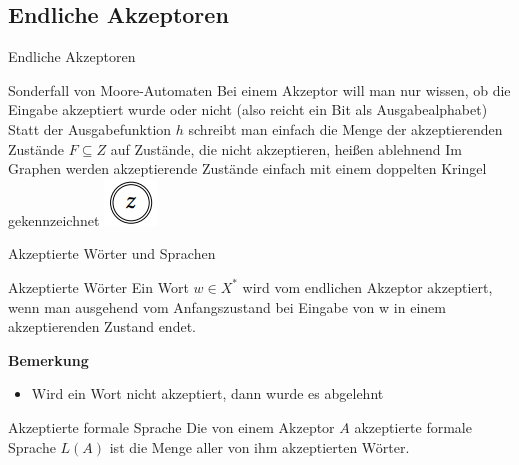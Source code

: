 \subsection{Endliche Akzeptoren}
\begin{frame}{Endliche Akzeptoren}
	\begin{itemize}
		\pitem Sonderfall von Moore-Automaten
		\pitem Bei einem Akzeptor will man nur wissen, ob die Eingabe akzeptiert wurde oder nicht (also reicht ein Bit als Ausgabealphabet)
		\pitem Statt der Ausgabefunktion $h$ schreibt man einfach die Menge der akzeptierenden Zustände $F \subseteq Z$ auf
		\pitem Zustände, die nicht akzeptieren, heißen ablehnend
		\pitem Im Graphen werden akzeptierende Zustände einfach mit einem doppelten Kringel gekennzeichnet \includegraphics[scale=0.6]{images/Doppelkringel.png}
	\end{itemize}
\end{frame}

\begin{frame}{Akzeptierte Wörter und Sprachen}
	\pause
	
	\begin{block}{Akzeptierte Wörter}\p
		Ein Wort $w \in X^*$ wird vom endlichen Akzeptor akzeptiert\ip, wenn man ausgehend vom Anfangszustand bei Eingabe von w in einem akzeptierenden Zustand endet.
	\end{block}

	\pause
	
	\textbf{Bemerkung}\\
	\begin{itemize}
		\item Wird ein Wort nicht akzeptiert, dann wurde es abgelehnt
	\end{itemize}

	\pause
	
	\begin{block}{Akzeptierte formale Sprache}\p
		Die von einem Akzeptor $A$ akzeptierte formale Sprache $L(A)$ ist die Menge aller von ihm akzeptierten Wörter.
	\end{block}
\end{frame}

